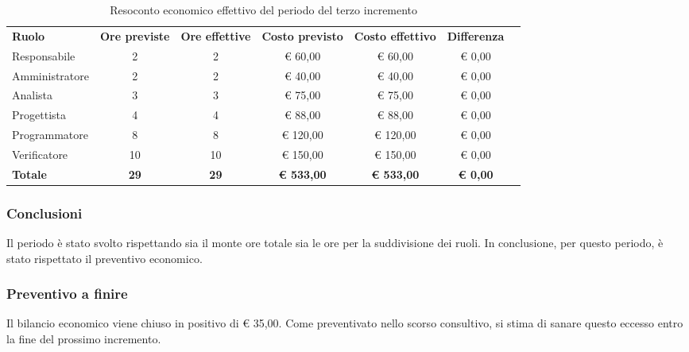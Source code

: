 \documentclass[../piano-di-progetto.tex]{subfiles}
\begin{document}
  \begin{table}[H]
    \centering
    \begin{tabular}{lcccccc}
      \rowcolor{lightgray}
      \textbf{Ruolo}  & \textbf{Ore previste} & \textbf{Ore effettive} & \textbf{Costo previsto} & \textbf{Costo effettivo} & \textbf{Differenza} \\
Responsabile    & 2           & 2           & € 60,00           & € 60,00           & € 0,00          \\
Amministratore  & 2           & 2           & € 40,00           & € 40,00           & € 0,00          \\
Analista        & 3           & 3           & € 75,00           & € 75,00           & € 0,00          \\
Progettista     & 4           & 4           & € 88,00           & € 88,00           & € 0,00          \\
Programmatore   & 8           & 8           & € 120,00          & € 120,00          & € 0,00          \\
Verificatore    & 10          & 10          & € 150,00          & € 150,00          & € 0,00          \\
\textbf{Totale} & \textbf{29} & \textbf{29} & \textbf{€ 533,00} & \textbf{€ 533,00} & \textbf{€ 0,00}

    \end{tabular}
    \caption{Resoconto economico effettivo del periodo del terzo incremento}
  \end{table}


\subsubsection{Conclusioni}
Il periodo è stato svolto rispettando sia il monte ore totale sia le ore per la suddivisione dei ruoli. In conclusione, per questo periodo, è stato rispettato il preventivo economico.

\subsubsection{Preventivo a finire}
Il bilancio economico viene chiuso in positivo di € 35,00. Come preventivato nello scorso consultivo, si stima di sanare questo eccesso entro la fine del prossimo incremento.
\end{document}
